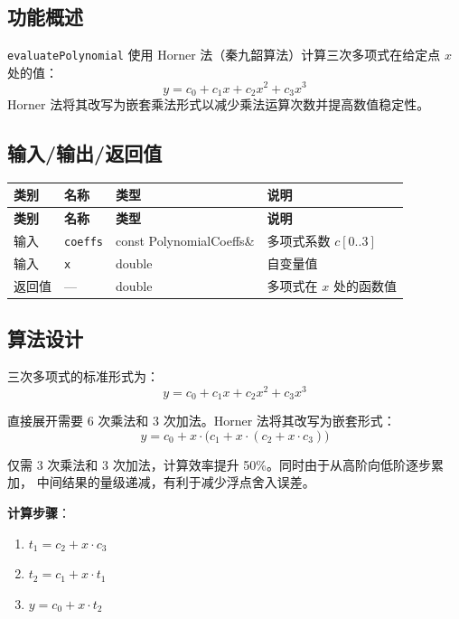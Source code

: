 \documentclass[a4paper,10pt]{article}
\begin{document}
\subsection{功能概述}

\texttt{evaluatePolynomial} 使用 Horner 法（秦九韶算法）计算三次多项式在给定点 $x$ 处的值：
\[
  y = c_0 + c_1 x + c_2 x^2 + c_3 x^3
\]
Horner 法将其改写为嵌套乘法形式以减少乘法运算次数并提高数值稳定性。

\subsection{输入/输出/返回值}

\renewcommand{\arraystretch}{1.3}
\begin{longtable}{|C{1.5cm}|L{3.5cm}|C{3cm}|L{7cm}|}
\hline
\textbf{类别} & \textbf{名称} & \textbf{类型} & \textbf{说明} \\
\hline
\endfirsthead
\hline
\textbf{类别} & \textbf{名称} & \textbf{类型} & \textbf{说明} \\
\hline
\endhead
输入 & \texttt{coeffs} & const PolynomialCoeffs\& & 多项式系数 $c[0..3]$ \\
\hline
输入 & \texttt{x} & double & 自变量值 \\
\hline
返回值 & --- & double & 多项式在 $x$ 处的函数值 \\
\hline
\end{longtable}

\subsection{算法设计}

三次多项式的标准形式为：
\begin{equation}
  y = c_0 + c_1 x + c_2 x^2 + c_3 x^3
\end{equation}

直接展开需要 6 次乘法和 3 次加法。Horner 法将其改写为嵌套形式：
\begin{equation}
  y = c_0 + x \cdot \big(c_1 + x \cdot (c_2 + x \cdot c_3)\big)
\end{equation}

仅需 3 次乘法和 3 次加法，计算效率提升 50\%。同时由于从高阶向低阶逐步累加，
中间结果的量级递减，有利于减少浮点舍入误差。

\textbf{计算步骤}：
\begin{enumerate}
  \item $t_1 = c_2 + x \cdot c_3$
  \item $t_2 = c_1 + x \cdot t_1$
  \item $y = c_0 + x \cdot t_2$
\end{enumerate}
\end{document}

